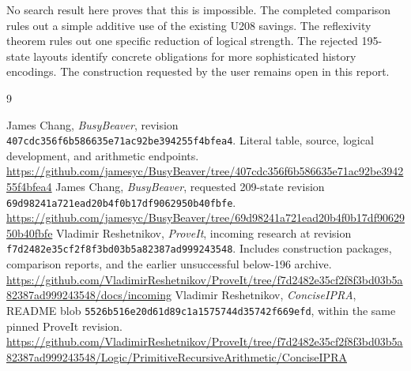 \documentclass[11pt,a4paper]{article}
\newcommand{\code}[1]{\nolinkurl{#1}}
\begin{document}
No search result here proves that this is impossible. The completed comparison rules out a simple additive use of the existing U208 savings. The reflexivity theorem rules out one specific reduction of logical strength. The rejected 195-state layouts identify concrete obligations for more sophisticated history encodings. The construction requested by the user remains open in this report.

\begin{thebibliography}{9}
\raggedright
{} James Chang, \emph{BusyBeaver}, revision \code{407cdc356f6b586635e71ac92be394255f4bfea4}. Literal table, source, logical development, and arithmetic endpoints.\\
\url{https://github.com/jamesyc/BusyBeaver/tree/407cdc356f6b586635e71ac92be394255f4bfea4}
 James Chang, \emph{BusyBeaver}, requested 209-state revision \code{69d98241a721ead20b4f0b17df9062950b40fbfe}.\\
\url{https://github.com/jamesyc/BusyBeaver/tree/69d98241a721ead20b4f0b17df9062950b40fbfe}
 Vladimir Reshetnikov, \emph{ProveIt}, incoming research at revision \code{f7d2482e35cf2f8f3bd03b5a82387ad999243548}. Includes construction packages, comparison reports, and the earlier unsuccessful below-196 archive.\\
\url{https://github.com/VladimirReshetnikov/ProveIt/tree/f7d2482e35cf2f8f3bd03b5a82387ad999243548/docs/incoming}
 Vladimir Reshetnikov, \emph{ConciseIPRA}, README blob \code{5526b516e20d61d89c1a1575744d35742f669efd}, within the same pinned ProveIt revision.\\
\url{https://github.com/VladimirReshetnikov/ProveIt/tree/f7d2482e35cf2f8f3bd03b5a82387ad999243548/Logic/PrimitiveRecursiveArithmetic/ConciseIPRA}
\end{thebibliography}
\end{document}
